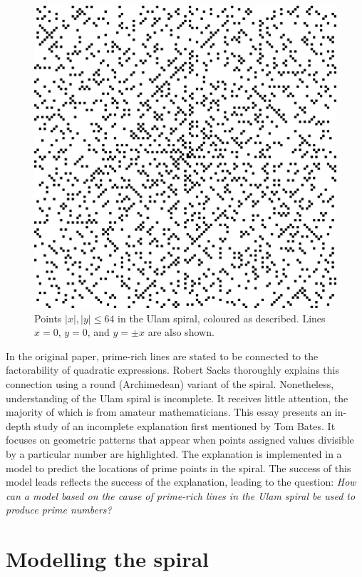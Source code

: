 \documentclass{article}
\begin{document}
\begin{figure}[h!]
	\centering
	\includegraphics[width=\textwidth]{ulamspiral}
	\caption{Points \(|x|,|y|\leq64\) in the Ulam spiral, coloured as described. Lines \(x=0\), \(y=0\), and \(y=\pm x\) are also shown.}
	\label{ulamspiral}
\end{figure}

In the original paper, prime-rich lines are stated to be connected to the factorability of quadratic expressions. Robert Sacks thoroughly explains this connection using a round (Archimedean) variant of the spiral. Nonetheless, understanding of the Ulam spiral is incomplete. It receives little attention, the majority of which is from amateur mathematicians. This essay presents an in-depth study of an incomplete explanation first mentioned by Tom Bates. It focuses on geometric patterns that appear when points assigned values divisible by a particular number are highlighted. The explanation is implemented in a model to predict the locations of prime points in the spiral. The success of this model leads reflects the success of the explanation, leading to the question: \textit{How can a model based on the cause of prime-rich lines in the Ulam spiral be used to produce prime numbers?}



\section{Modelling the spiral}
\end{document}
